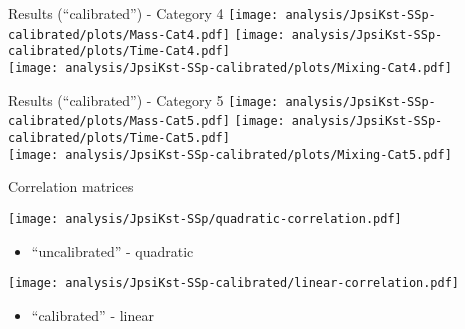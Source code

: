 \begin{frame}[plain]{Results (\enquote{calibrated}) - Category 4}
  \centering
  \texttt{[image: analysis/JpsiKst-SSp-calibrated/plots/Mass-Cat4.pdf]}
  \texttt{[image: analysis/JpsiKst-SSp-calibrated/plots/Time-Cat4.pdf]} \\
  \texttt{[image: analysis/JpsiKst-SSp-calibrated/plots/Mixing-Cat4.pdf]}
\end{frame}

\begin{frame}[plain]{Results (\enquote{calibrated}) - Category 5}
  \centering
  \texttt{[image: analysis/JpsiKst-SSp-calibrated/plots/Mass-Cat5.pdf]}
  \texttt{[image: analysis/JpsiKst-SSp-calibrated/plots/Time-Cat5.pdf]} \\
  \texttt{[image: analysis/JpsiKst-SSp-calibrated/plots/Mixing-Cat5.pdf]}
\end{frame}

\begin{frame}[plain]{Correlation matrices}
  \begin{minipage}{0.48\textwidth}
  \texttt{[image: analysis/JpsiKst-SSp/quadratic-correlation.pdf]}
  \begin{itemize}
    \item \enquote{uncalibrated} - quadratic
  \end{itemize}
  \end{minipage}
  \begin{minipage}{0.48\textwidth}
  \texttt{[image: analysis/JpsiKst-SSp-calibrated/linear-correlation.pdf]}
  \begin{itemize}
    \item \enquote{calibrated} - linear
  \end{itemize}
  \end{minipage}
\end{frame}

\setcounter{framenumber}{\value{finalframe}}



